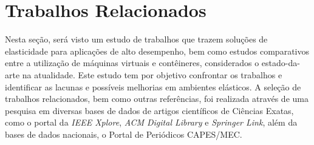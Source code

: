 \documentclass[twoside,english,brazilian]{UNISINOSartigo}
\begin{document}

\section{Trabalhos Relacionados}
\label{related}
Nesta seção, será visto um estudo de trabalhos que trazem soluções de elasticidade para aplicações de alto desempenho, bem como estudos comparativos entre a utilização de máquinas virtuais e contêineres, considerados o estado-da-arte na atualidade. Este estudo tem por objetivo confrontar os trabalhos e identificar as lacunas e possíveis melhorias em ambientes elásticos. A seleção de trabalhos relacionados, bem como outras referências, foi realizada através de uma pesquisa em diversas bases de dados de artigos científicos de Ciências Exatas, como o portal da \textit{IEEE Xplore}, \textit{ACM Digital Library} e \textit{Springer Link}, além da bases de dados nacionais, o Portal de Periódicos CAPES/MEC.
\end{document}
